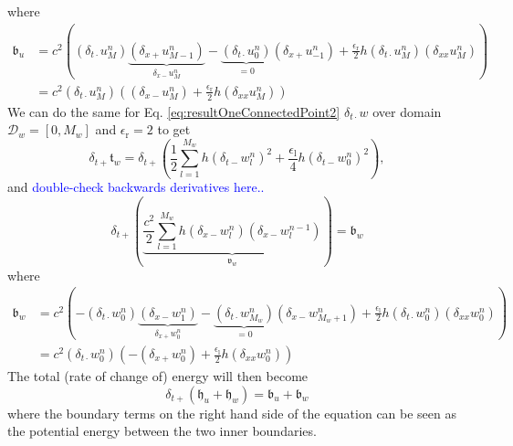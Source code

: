 \documentclass[dvipsnames]{article}
\def\SWcomment[#1]{\textcolor{blue}{#1}}
\begin{document}
where
\begin{align}
    \mathfrak{b}_u &= c^2\left((\delta_{t\cdot}u_M^n)\underbrace{(\delta_{x+}u_{M-1}^n)}_{\delta_{x-}u_M^n}- \underbrace{(\delta_{t\cdot}u_0^n)}_{= 0}(\delta_{x+}u_{-1}^n)+\frac{\epsilon_\text{r}}{2}h(\delta_{t\cdot}u_M^n)(\delta_{xx}u_M^n)\right)\nonumber\\
    & = c^2(\delta_{t\cdot}u_M^n)\left((\delta_{x-}u_M^n)+\frac{\epsilon_\text{r}}{2}h(\delta_{xx}u_M^n)\right)
\end{align}
%
We can do the same for Eq. \eqref{eq:resultOneConnectedPoint2} $\delta_{t\cdot}w$ over domain $\mathcal{D}_w = [0, M_w]$ and $\epsilon_\text{r} = 2$ to get 
\begin{equation}
    \delta_{t+}\mathfrak{t}_w = \delta_{t+}\left(\frac{1}{2}\sum_{l=1}^{M_w} h(\delta_{t-}w_l^n)^2 + \frac{\epsilon_\text{l}}{4}h(\delta_{t-}w_0^n)^2\right),
\end{equation}
and \SWcomment[double-check backwards derivatives here..]
\begin{equation}
    \delta_{t+}\left(\underbrace{\frac{c^2}2 \sum_{l=1}^{M_w} h (\delta_{x-}w_l^n)(\delta_{x-}w_l^{n-1})}_{\mathfrak{v}_w}\right) = \mathfrak{b}_w
\end{equation}
where
\begin{align}
    \mathfrak{b}_w &= c^2\left(-(\delta_{t\cdot}w_0^n)\underbrace{(\delta_{x-}w_{1}^n)}_{\delta_{x+}w_0^n}- \underbrace{(\delta_{t\cdot}w_{M_w}^n)}_{= 0}(\delta_{x-}w_{M_w+1}^n)+\frac{\epsilon_\text{l}}{2}h(\delta_{t\cdot}w_0^n)(\delta_{xx}w_0^n)\right)\nonumber\\
    &= c^2(\delta_{t\cdot}w_0^n)\left(-(\delta_{x+}w_0^n)+\frac{\epsilon_\text{l}}{2}h(\delta_{xx}w_0^n)\right)
\end{align}
The total (rate of change of) energy will then become 
\begin{equation}
    \delta_{t+}\left(\mathfrak{h}_u + \mathfrak{h}_w\right) = \mathfrak{b}_u + \mathfrak{b}_w
\end{equation}
where the boundary terms on the right hand side of the equation can be seen as the potential energy between the two inner boundaries. 
\end{document}
